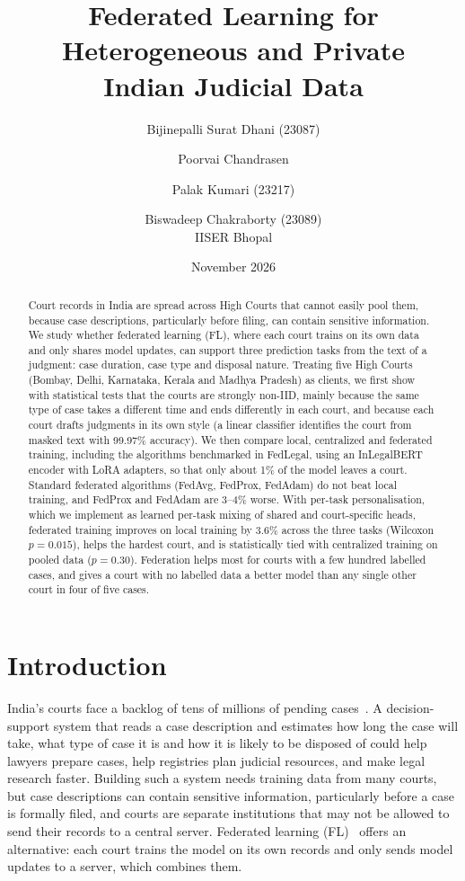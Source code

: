 \documentclass[11pt,a4paper]{article}
\title{Federated Learning for Heterogeneous and Private\\Indian Judicial Data}
\author{Bijinepalli Surat Dhani (23087) \and Poorvai Chandrasen \and Palak Kumari (23217) \and Biswadeep Chakraborty (23089)\\[4pt]
\small IISER Bhopal}
\date{November 2026}
\begin{document}
\maketitle

\begin{abstract}
Court records in India are spread across High Courts that cannot easily pool them, because case
descriptions, particularly before filing, can contain sensitive information. We study whether
federated learning (FL), where each court trains on its own data and only shares model updates, can
support three prediction tasks from the text of a judgment: case duration, case type and disposal
nature. Treating five High Courts (Bombay, Delhi, Karnataka, Kerala and Madhya Pradesh) as clients,
we first show with statistical tests that the courts are strongly non-IID, mainly because the same
type of case takes a different time and ends differently in each court, and because each court
drafts judgments in its own style (a linear classifier identifies the court from masked text with
99.97\% accuracy). We then compare local, centralized and federated training, including the
algorithms benchmarked in FedLegal, using an InLegalBERT encoder with LoRA adapters, so that only
about 1\% of the model leaves a court. Standard federated algorithms (FedAvg, FedProx, FedAdam) do
not beat local training, and FedProx and FedAdam are 3--4\% worse. With per-task personalisation, which we
implement as learned per-task mixing of shared and court-specific heads, federated training improves on
local training by 3.6\% across the three tasks (Wilcoxon $p=0.015$), helps the hardest court, and is
statistically tied with centralized training on pooled data ($p=0.30$). Federation helps most for
courts with a few hundred labelled cases, and gives a court with no labelled data a better model than
any single other court in four of five cases.
\end{abstract}

\section{Introduction}
India's courts face a backlog of tens of millions of pending cases~\cite{njdg}. A decision-support
system that reads a case description and estimates how long the case will take, what type of case it
is and how it is likely to be disposed of could help lawyers prepare cases, help registries plan
judicial resources, and make legal research faster. Building such a system needs training data from
many courts, but case descriptions can contain sensitive information, particularly before a case is
formally filed, and courts are separate institutions that may not be allowed to send their records to
a central server. Federated learning (FL)~\cite{mcmahan2017communication} offers an alternative:
each court trains the model on its own records and only sends model updates to a server, which
combines them.
\end{document}
